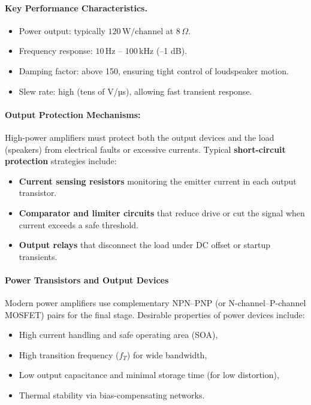 \paragraph{Key Performance Characteristics.}
\begin{itemize}
  \item Power output: typically $120\,\text{W}/\text{channel}$ at $8\,\Omega$.
  \item Frequency response: $10\,\text{Hz}$ – $100\,\text{kHz}$ (–1 dB).
  \item Damping factor: above 150, ensuring tight control of loudspeaker motion.
  \item Slew rate: high (tens of V/µs), allowing fast transient response.
\end{itemize}

\paragraph{Output Protection Mechanisms: }
High-power amplifiers must protect both the output devices and the load (speakers) from electrical faults or excessive currents.  
Typical \textbf{short-circuit protection} strategies include:
\begin{itemize}
  \item \textbf{Current sensing resistors} monitoring the emitter current in each output transistor.
  \item \textbf{Comparator and limiter circuits} that reduce drive or cut the signal when current exceeds a safe threshold.
  \item \textbf{Output relays} that disconnect the load under DC offset or startup transients.
\end{itemize}

\paragraph{Power Transistors and Output Devices}
Modern power amplifiers use complementary NPN–PNP (or N-channel–P-channel MOSFET) pairs for the final stage.  
Desirable properties of power devices include:
\begin{itemize}
  \item High current handling and safe operating area (SOA),
  \item High transition frequency ($f_T$) for wide bandwidth,
  \item Low output capacitance and minimal storage time (for low distortion),
  \item Thermal stability via bias-compensating networks.
\end{itemize}

